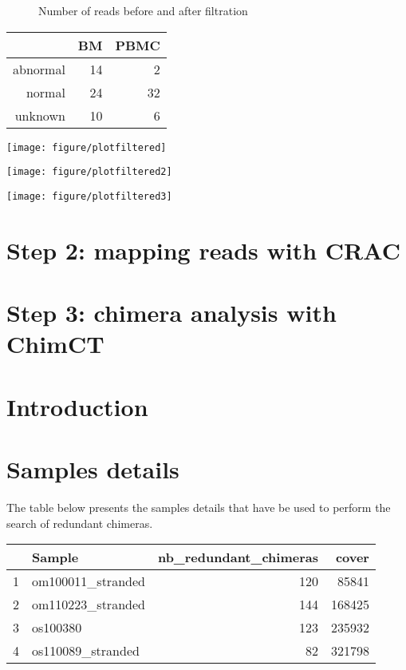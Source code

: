 \documentclass[a4paper]{article}\usepackage[]{graphicx}\usepackage[]{color}
\makeatletter
\def\maxwidth{ %
  \ifdim\Gin@nat@width>\linewidth
    \linewidth
  \else
    \Gin@nat@width
  \fi
}
\makeatother
\begin{document}
\begin{figure}[h]
  \centering
  \caption{Number of reads before and after filtration}
  \label{fig:renamed}

\end{figure}

\begin{tabular}{rrr}
  \hline
 & BM & PBMC \\ 
  \hline
abnormal &  14 &   2 \\ 
  normal &  24 &  32 \\ 
  unknown &  10 &   6 \\ 
   \hline
\end{tabular}

\texttt{[image: figure/plotfiltered]} 




\texttt{[image: figure/plotfiltered2]} 




\texttt{[image: figure/plotfiltered3]} 



\section{Step 2: mapping reads with CRAC}


\section{Step 3: chimera analysis with ChimCT}












\section{Introduction}

\section{Samples details}
The table below presents the samples details that have be used to perform the search of redundant chimeras.

\begin{longtable}{rlrr}
  \hline
 & Sample & nb\_redundant\_chimeras & cover \\ 
  \hline
1 & om100011\_stranded & 120 & 85841 \\ 
  2 & om110223\_stranded & 144 & 168425 \\ 
  3 & os100380 & 123 & 235932 \\ 
  4 & os110089\_stranded &  82 & 321798 \\ 
   \hline
\hline
\end{longtable}
\end{document}
